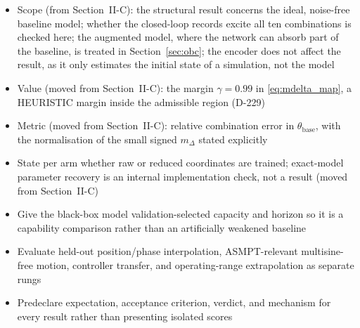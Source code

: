 \begin{wip}
\begin{itemize}
\item Scope (from Section~II-C): the structural result concerns the ideal, noise-free baseline model; whether the closed-loop records excite all ten combinations is checked here; the augmented model, where the network can absorb part of the baseline, is treated in Section~\ref{sec:obc}; the encoder does not affect the result, as it only estimates the initial state of a simulation, not the model
\item Value (moved from Section~II-C): the margin $\gamma=0.99$ in \eqref{eq:mdelta_map}, a HEURISTIC margin inside the admissible region (D-229)
\item Metric (moved from Section~II-C): relative combination error in $\theta_{\mathrm{base}}$, with the normalisation of the small signed $m_\Delta$ stated explicitly
\item State per arm whether raw or reduced coordinates are trained; exact-model parameter recovery is an internal implementation check, not a result (moved from Section~II-C)
\item Give the black-box model validation-selected capacity and horizon so it is a capability comparison rather than an artificially weakened baseline
\item Evaluate held-out position/phase interpolation, ASMPT-relevant multisine-free motion, controller transfer, and operating-range extrapolation as separate rungs
\item Predeclare expectation, acceptance criterion, verdict, and mechanism for every result rather than presenting isolated scores
\end{itemize}


\end{wip}
